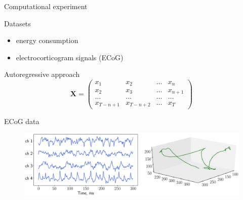 \documentclass[9pt]{beamer}
\begin{document}
\begin{frame}{Computational experiment}
	\begin{minipage}{0.55\textwidth}
		\begin{block}{Datasets}
			\vspace{0.35cm}
			\begin{itemize}
				\item energy consumption
				\item electrocorticogram signals (ECoG)
			\end{itemize}
		\end{block}
		\vspace{0.5cm}
	\end{minipage}%
	\begin{minipage}{0.45\textwidth}
		\begin{block}{Autoregressive approach}
				\[
				\mathbf{X} = 
				\begin{pmatrix}
				x_1 & x_2 & \dots & x_n \\
				x_2 & x_3 & \dots & x_{n+1} \\
				\dots & \dots & \dots & \dots \\
				x_{T-n+1} & x_{T-n+2} & \dots & x_T
				\end{pmatrix}
				\]
		\end{block}
	\end{minipage}
	\begin{block}{ECoG data}
	\begin{figure}
		\includegraphics[width=\linewidth]{figs/ecog_data}
	\end{figure}
	\end{block}
\end{frame}
\end{document}
